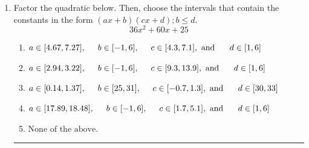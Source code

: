 \documentclass[14pt]{extbook}
\newcommand{\litem}[1]{\item#1\hspace*{-1cm}\rule{\textwidth}{0.4pt}}
\begin{document}
\begin{enumerate}
{\begin{enumerate}[label=\Alph*.]
\end{enumerate} }
\litem{
Factor the quadratic below. Then, choose the intervals that contain the constants in the form $(ax+b)(cx+d); b \leq d.$\[ 36x^{2} +60 x + 25 \]\begin{enumerate}[label=\Alph*.]
\item \( a \in [4.67, 7.27], \hspace*{5mm} b \in [-1, 6], \hspace*{5mm} c \in [4.3, 7.1], \text{ and } \hspace*{5mm} d \in [1, 6] \)
\item \( a \in [2.94, 3.22], \hspace*{5mm} b \in [-1, 6], \hspace*{5mm} c \in [9.3, 13.9], \text{ and } \hspace*{5mm} d \in [1, 6] \)
\item \( a \in [0.14, 1.37], \hspace*{5mm} b \in [25, 31], \hspace*{5mm} c \in [-0.7, 1.3], \text{ and } \hspace*{5mm} d \in [30, 33] \)
\item \( a \in [17.89, 18.48], \hspace*{5mm} b \in [-1, 6], \hspace*{5mm} c \in [1.7, 5.1], \text{ and } \hspace*{5mm} d \in [1, 6] \)
\item \( \text{None of the above.} \)


\end{enumerate}}
\end{enumerate}
\end{document}
